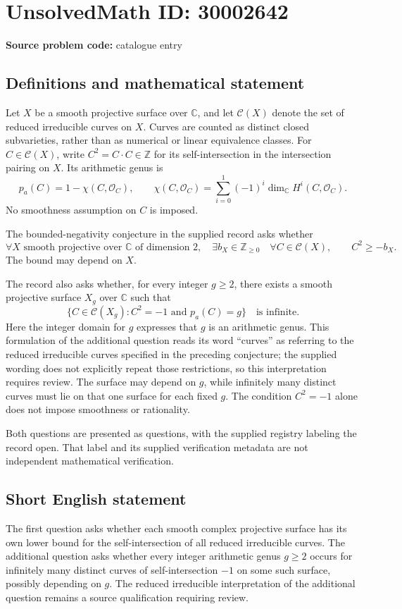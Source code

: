 \documentclass[11pt]{article}
\newcommand{\Z}{\mathbb{Z}}
\newcommand{\C}{\mathbb{C}}
\begin{document}
\section*{UnsolvedMath ID: 30002642}
\textbf{Source problem code:} catalogue entry
\subsection{Definitions and mathematical statement}
Let \(X\) be a smooth projective surface over \(\C\), and let \(\mathcal C(X)\) denote the set of reduced irreducible curves on \(X\). Curves are counted as distinct closed subvarieties, rather than as numerical or linear equivalence classes. For \(C\in\mathcal C(X)\), write \(C^2=C\cdot C\in\Z\) for its self-intersection in the intersection pairing on \(X\). Its arithmetic genus is
\[
p_a(C)=1-\chi(C,\mathcal O_C),\qquad
\chi(C,\mathcal O_C)=\sum_{i=0}^{1}(-1)^i\dim_{\C}H^i(C,\mathcal O_C).
\]
No smoothness assumption on \(C\) is imposed.

The bounded-negativity conjecture in the supplied record asks whether
\[
\forall X\text{ smooth projective over }\C\text{ of dimension }2,\quad
\exists b_X\in\Z_{\geq 0}\quad
\forall C\in\mathcal C(X),\qquad C^2\geq-b_X.
\]
The bound may depend on \(X\).

The record also asks whether, for every integer \(g\geq2\), there exists a smooth projective surface \(X_g\) over \(\C\) such that
\[
\bigl\{C\in\mathcal C(X_g): C^2=-1\text{ and }p_a(C)=g\bigr\}
\quad\text{is infinite}.
\]
Here the integer domain for \(g\) expresses that \(g\) is an arithmetic genus. This formulation of the additional question reads its word ``curves'' as referring to the reduced irreducible curves specified in the preceding conjecture; the supplied wording does not explicitly repeat those restrictions, so this interpretation requires review. The surface may depend on \(g\), while infinitely many distinct curves must lie on that one surface for each fixed \(g\). The condition \(C^2=-1\) alone does not impose smoothness or rationality.

Both questions are presented as questions, with the supplied registry labeling the record open. That label and its supplied verification metadata are not independent mathematical verification.
\subsection{Short English statement}
The first question asks whether each smooth complex projective surface has its own lower bound for the self-intersection of all reduced irreducible curves. The additional question asks whether every integer arithmetic genus \(g\geq2\) occurs for infinitely many distinct curves of self-intersection \(-1\) on some such surface, possibly depending on \(g\). The reduced irreducible interpretation of the additional question remains a source qualification requiring review.
\end{document}
